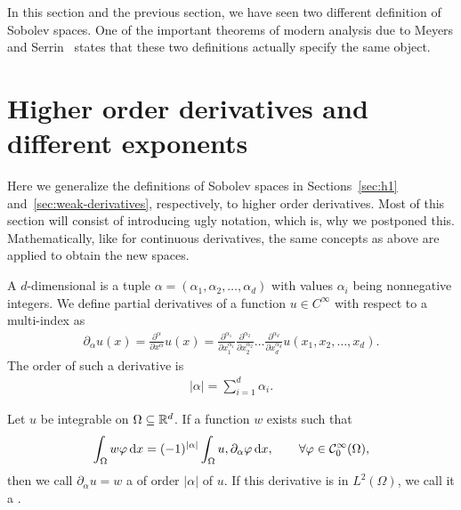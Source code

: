 \begin{remark}
  In this section and the previous section, we have seen two different
  definition of Sobolev spaces. One of the important theorems of
  modern analysis due to Meyers and Serrin~\cite{MeyersSerrin64}
  states that these two definitions actually specify the same object.
\end{remark}

\section{Higher order derivatives and different exponents}
\label{sec:higher-derivatives}

\begin{intro}
  Here we generalize the definitions of Sobolev spaces in
  Sections~\ref{sec:h1} and~\ref{sec:weak-derivatives}, respectively,
  to higher order derivatives. Most of this section will consist of
  introducing ugly notation, which is, why we postponed
  this. Mathematically, like for continuous derivatives, the same
  concepts as above are applied to obtain the new spaces.
\end{intro}

\begin{definition}
  A $d$-dimensional  is a tuple
  $\alpha=(\alpha_1,\alpha_2,\dots,\alpha_d)$ with values $\alpha_i$
  being nonnegative integers. We define partial derivatives of a
  function $u\in C^\infty$ with respect to a multi-index as
  \begin{gather*}
    \partial_{\alpha}u(x) = \frac{\partial^\alpha}{\partial x^\alpha}
    u(x)
    = \frac{\partial^{\alpha_1}}{\partial x_1^{\alpha_1}}
    \frac{\partial^{\alpha_2}}{\partial x_2^{\alpha_2}}
    \dots
    \frac{\partial^{\alpha_d}}{\partial x_d^{\alpha_d}}
    u(x_1,x_2,\dots,x_d).
  \end{gather*}
  The order of such a derivative is
  \begin{gather*}
    |\alpha| = \sum_{i=1}^d \alpha_i.
  \end{gather*}
\end{definition}

\begin{definition}
  Let $u$ be integrable on $\Omega\subseteq \mathbb R^d$. If a function $w$
  exists such that
  \begin{gather}
    \int_\Omega w \varphi\,\mathrm{d} x = (-1)^{|\alpha|} \int_\Omega
    u, \partial_\alpha \varphi \,\mathrm{d} x,
    \qquad\forall \varphi\in \mathcal C^\infty_0(\Omega),
  \end{gather}
  then we call $\partial_\alpha u = w$ a  of
  order $|\alpha|$ of $u$. If this derivative is in $L^2(\Omega)$, we
  call it a .
\end{definition}

